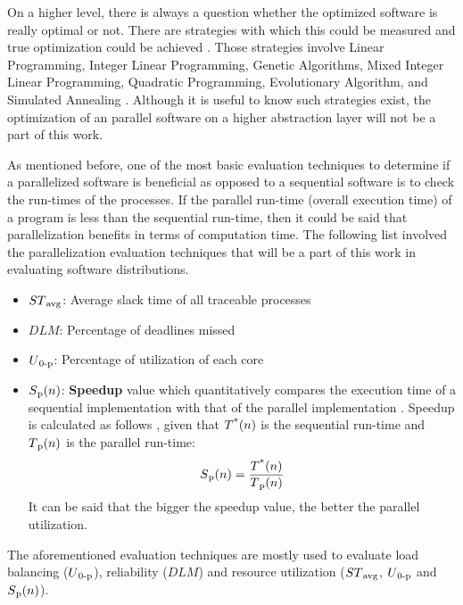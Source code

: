 On a higher level, there is always a question whether the optimized software is really optimal or not. There are strategies with which this could be measured and true optimization could be achieved \cite{lukas1}. Those strategies involve Linear Programming, Integer Linear Programming, Genetic Algorithms, Mixed Integer Linear Programming, Quadratic Programming, Evolutionary Algorithm, and Simulated Annealing \cite{lukas1}. Although it is useful to know such strategies exist, the optimization of an parallel software on a higher abstraction layer will not be a part of this work. 

As mentioned before, one of the most basic evaluation techniques to determine if a parallelized software is beneficial as opposed to a sequential software is to check the run-times of the processes. If the parallel run-time (overall execution time) of a program is less than the sequential run-time, then it could be said that parallelization benefits in terms of computation time. The following list involved the parallelization evaluation techniques that will be a part of this work in evaluating software distributions.
\begin{itemize}
	\item ${ST\textsubscript{avg}}$: Average slack time of all traceable processes
	\item ${DLM}$: Percentage of deadlines missed
	\item ${U\textsubscript{0-p}}$: Percentage of utilization of each core
	\item ${S\textsubscript{p}(n)}$: \textbf{Speedup} value which quantitatively compares the execution time of a sequential implementation with that of the parallel implementation \cite{springerparallel}. Speedup is calculated as follows \cite{springerparallel}, given that ${T\textsuperscript{*}(n)}$ is the sequential run-time and ${T\textsubscript{p}(n)}$ is the parallel run-time:
	\begin{equation}\label{speedupeqn}
	S\textsubscript{p}(n)=\frac{T\textsuperscript{*}(n)}{T\textsubscript{p}(n)}
	\end{equation}
	It can be said that the bigger the speedup value, the better the parallel utilization.
\end{itemize}
The aforementioned evaluation techniques are mostly used to evaluate load balancing (${U\textsubscript{0-p}}$), reliability (${DLM}$) and resource utilization (${ST\textsubscript{avg}}$, ${U\textsubscript{0-p}}$ and ${S\textsubscript{p}(n)}$). 


